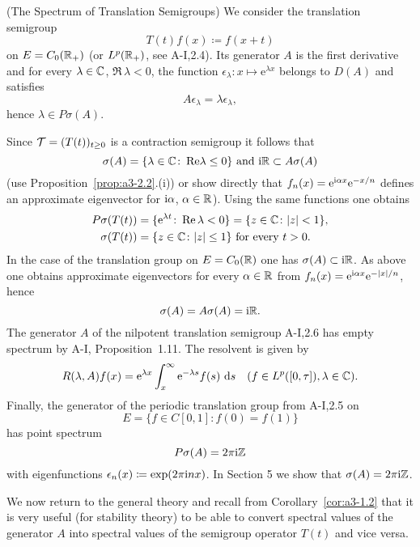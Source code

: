 \begin{example}{(The Spectrum of Translation Semigroups)}\label{ex:a3-2.4}
We consider the translation semigroup
\[
T(t)f(x) \coloneqq f(x+t)
\]
on $E = C_{0}(\mathbb{R}_{+})$ (or $L^{p}(\mathbb{R}_{+})$, see A-I,2.4).
Its generator $A$ is the first derivative and for every $\lambda \in \mathbb{C}$, $\Re\,\lambda < 0$, the function $\epsilon_{\lambda} \colon x \mapsto \mathrm{e}^{\lambda x}$ belongs to $D(A)$ and satisfies
\[
A\epsilon_{\lambda} = \lambda\epsilon_{\lambda} ,
\]
hence $\lambda \in P\sigma(A)$.

Since $\mathcal{T} = (T(t))_{t \geq 0}$ is a contraction semigroup it follows that 
%
\[
	 \text{$\sigma(A) = \{\lambda \in \mathbb{C} \colon \mathop{}\!\mathrm{Re}\lambda \leq 0\}$  and $\mathrm{i}\mathbb{R} \subset A\sigma(A)$}  
\]
%
(use Proposition~\ref{prop:a3-2.2}.(i)) or show directly that $f_{n}(x) = \mathrm{e}^{ \mathrm{i}\alpha x}\mathrm{e}^{-x/n}$ defines an approximate eigenvector for $\mathrm{i}\alpha$, $\alpha \in \mathbb{R}$).
Using the same functions one obtains
\begin{align*}
	P\sigma(T(t)) &= \{\mathrm{e}^{\lambda t} \colon \mathop{}\!\mathrm{Re}\,\lambda < 0\} = \{z \in \mathbb{C} \colon |z| < 1\} ,\\
	\sigma(T(t)) &= \{z \in \mathbb{C} \colon |z| \leq 1\} \text{ for every } t > 0 .
\end{align*}
In the case of the translation group on $E = C_{0}(\mathbb{R})$ one has $\sigma(A) \subset \mathrm{i}\mathbb{R}$.
As above one obtains approximate eigenvectors for every $\alpha \in \mathbb{R}$ from 
$f_{n}(x) = \mathrm{e}^{\mathrm{i}\alpha x}\mathrm{e}^{-|x|/n}$, hence
\[
\sigma(A) = A\sigma(A) = \mathrm{i}\mathbb{R} .
\]
The generator $A$ of the nilpotent translation semigroup A-I,2.6 has empty spectrum by A-I, Proposition~1.11.
The resolvent is given by
\[
R(\lambda,A)f(x) = \mathrm{e}^{\lambda x}\int_{x}^{\infty}\mathrm{e}^{-\lambda s}f(s) \, \mathop{}\!\mathrm{d}{s} \quad (f \in L^{p}([0,\tau]), \lambda \in \mathbb{C}) .
\]
Finally, the generator of the periodic translation group from A-I,2.5 on
\[
	E = \{f \in C[0,1] \colon f(0) = f(1)\}
\]
%
has point spectrum
\[
P\sigma(A) = 2\pi \mathrm{i}\mathbb{Z}
\]
with eigenfunctions $\epsilon_{n}(x) \coloneqq \exp(2\pi \mathrm{i} n x)$.
In Section 5 we show that $\sigma(A) = 2\pi \mathrm{i}\mathbb{Z}$.
\end{example}
We now return to the general theory and recall from Corollary~\ref{cor:a3-1.2} that it is very useful (\eg for stability theory) to be able to convert
spectral values of the generator $A$ into spectral values of the semigroup operator $T(t)$ and vice versa.
